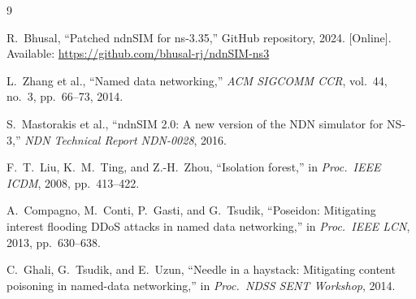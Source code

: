 \documentclass[11pt,a4paper]{article}
\begin{document}
\begin{thebibliography}{9}

R.~Bhusal, ``Patched ndnSIM for ns-3.35,'' GitHub repository, 2024. [Online]. Available: \url{https://github.com/bhusal-rj/ndnSIM-ns3}

L.~Zhang et al., ``Named data networking,'' \textit{ACM SIGCOMM CCR}, vol.~44, no.~3, pp.~66--73, 2014.

S.~Mastorakis et al., ``ndnSIM 2.0: A new version of the NDN simulator for NS-3,'' \textit{NDN Technical Report NDN-0028}, 2016.

F.~T.~Liu, K.~M.~Ting, and Z.-H.~Zhou, ``Isolation forest,'' in \textit{Proc.\ IEEE ICDM}, 2008, pp.~413--422.

A.~Compagno, M.~Conti, P.~Gasti, and G.~Tsudik, ``Poseidon: Mitigating interest flooding DDoS attacks in named data networking,'' in \textit{Proc.\ IEEE LCN}, 2013, pp.~630--638.

C.~Ghali, G.~Tsudik, and E.~Uzun, ``Needle in a haystack: Mitigating content poisoning in named-data networking,'' in \textit{Proc.\ NDSS SENT Workshop}, 2014.

\end{thebibliography}
\end{document}
